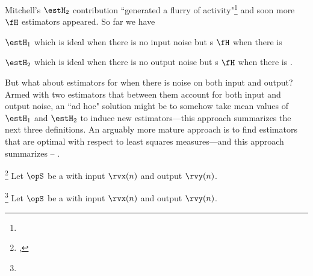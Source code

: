 Mitchell's $\estH_2$ contribution ``generated a flurry of activity"\footnote{}
and soon more $\fH$ estimators appeared. 
So far we have 
\begin{listi}
  \item $\estH_1$ which is ideal when there is no input noise but 
        s $\fH$ when there is 
  \item $\estH_2$ which is ideal when there is no output noise but
        s $\fH$ when there is .
\end{listi}
But what about estimators for when there is noise on both input and output?
Armed with two estimators that between them account for both input and output noise,
an ``ad hoc" solution might be to somehow take mean values of $\estH_1$ and $\estH_2$ 
to induce new estimators---this approach summarizes the next three definitions.
An arguably more mature approach is to find estimators that are optimal with respect to least squares measures---and
this approach summarizes  -- .

\begin{definition}
\footnote{
  ,
  }
\label{def:Havg}
Let $\opS$ be a  with input $\rvx(n)$ and output $\rvy(n)$.
\end{definition}

\begin{definition}
\footnote{
  }
\label{def:Hgm}
Let $\opS$ be a  with input $\rvx(n)$ and output $\rvy(n)$.
\end{definition}

